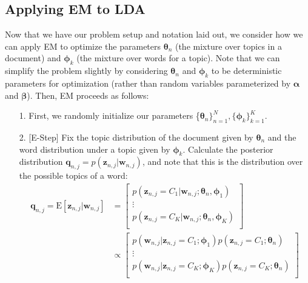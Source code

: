 \subsection{Applying EM to LDA}
Now that we have our problem setup and notation laid out, we consider how we can apply EM to optimize the parameters $\boldsymbol{\theta}_n$ (the mixture over topics in a document) and $\boldsymbol{\phi}_k$ (the mixture over words for a topic). Note that we can simplify the problem slightly by considering $\boldsymbol{\theta}_n$ and $\boldsymbol{\phi}_k$ to be deterministic parameters for optimization (rather than random variables parameterized by $\boldsymbol{\alpha}$ and $\boldsymbol{\beta}$). Then, EM proceeds as follows:

\begin{itemize}
    \item[1.] First, we randomly initialize our parameters \{$\boldsymbol{\theta}_n \}_{n=1}^{N}, \{ \boldsymbol{\phi}_k\}_{k=1}^{K}$.
    \item[2.] [E-Step] Fix the topic distribution of the document given by $\boldsymbol{\theta}_n$ and the word distribution under a topic given by $\boldsymbol{\phi}_k$. Calculate the posterior distribution $\textbf{q}_{n, j} = p(\textbf{z}_{n, j} | \textbf{w}_{n, j})$, and note that this is the distribution over the possible topics of a word:
        \begin{align*}
            \textbf{q}_{n, j} = \mathrm{E}[\textbf{z}_{n, j} | \textbf{w}_{n, j}] &= \begin{bmatrix}
                p(\textbf{z}_{n, j} = C_1 | \textbf{w}_{n, j}; \boldsymbol{\theta}_n, \boldsymbol{\phi}_1) \\
                \vdots \\
                p(\textbf{z}_{n, j} = C_K | \textbf{w}_{n, j}; \boldsymbol{\theta}_n, \boldsymbol{\phi}_K) \\
            \end{bmatrix} \\
            &\propto \begin{bmatrix}
                p(\textbf{w}_{n, j} | \textbf{z}_{n, j} = C_1; \boldsymbol{\phi}_1) p(\textbf{z}_{n, j}  = C_1; \boldsymbol{\theta}_n) \\
                \vdots \\
                p(\textbf{w}_{n, j} | \textbf{z}_{n, j} = C_K; \boldsymbol{\phi}_K) p(\textbf{z}_{n, j}  = C_K; \boldsymbol{\theta}_n) \\
            \end{bmatrix} \\

\end{align*}
\end{itemize}
